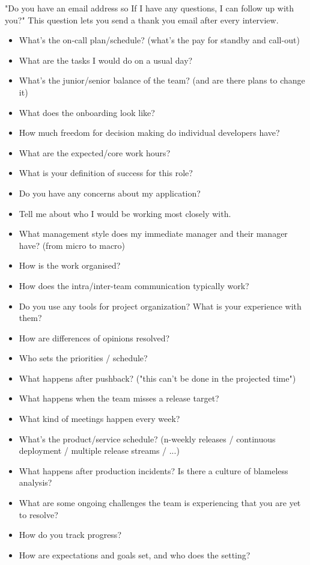 \documentclass{article}
\begin{document}
"Do you have an email address so If I have any questions, I can follow
up with you?" This question lets you send a thank you email after every
interview.

\begin{itemize}
\item What's the on-call plan/schedule? (what's the pay for standby and call-out)
\item What are the tasks I would do on a usual day?
\item What's the junior/senior balance of the team? (and are there plans to change it)
\item What does the onboarding look like?
\item How much freedom for decision making do individual developers have?
\item What are the expected/core work hours?
\item What is your definition of success for this role?
\item Do you have any concerns about my application?
\item Tell me about who I would be working most closely with.
\item What management style does my immediate manager and their manager have? (from micro to macro)
\item How is the work organised?
\item How does the intra/inter-team communication typically work?
\item Do you use any tools for project organization? What is your experience with them?
\item How are differences of opinions resolved?
\item Who sets the priorities / schedule?
\item What happens after pushback? ("this can't be done in the projected time")
\item What happens when the team misses a release target?
\item What kind of meetings happen every week?
\item What's the product/service schedule? (n-weekly releases / continuous deployment / multiple release streams / ...)
\item What happens after production incidents? Is there a culture of blameless analysis?
\item What are some ongoing challenges the team is experiencing that you are yet to resolve?
\item How do you track progress?
\item How are expectations and goals set, and who does the setting?

\end{itemize}
\end{document}
